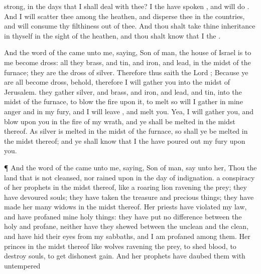 {strong, in the
days that I shall
deal with thee? I the
{} have
spoken
{}, and will
do
{}.
And I will
scatter thee among the
heathen, and
disperse thee in the
countries, and will
consume thy
filthiness out of thee.
And thou shalt take thine
inheritance in thyself in the
sight of the
heathen, and thou shalt
know that I
{} the
{}.
\par }{\PP {}And the
word of the
{} came unto me,
saying,
Son of
man, the
house of
Israel is to me become
dross: all they
{}
brass, and
tin, and
iron, and
lead, in the
midst of the
furnace; they are
{} the
dross of
silver.
Therefore thus
saith the
Lord
{}; Because ye are all become
dross, behold, therefore I will
gather you into the
midst of
Jerusalem.
 they
gather
silver, and
brass, and
iron, and
lead, and
tin, into the
midst of the
furnace, to
blow the
fire upon it, to
melt
{} so will I
gather
{} in mine
anger and in my
fury, and I will
leave
{}, and
melt you.
Yea, I will
gather you, and
blow upon you in the
fire of my
wrath, and ye shall be
melted in the
midst thereof.
As
silver is
melted in the
midst of the
furnace, so shall ye be
melted in the
midst thereof; and ye shall
know that I the
{} have poured
out my
fury upon you.
\par }{\PP {}¶ And the
word of the
{} came unto me,
saying,
Son of
man,
say unto her, Thou
{} the
land that is not
cleansed, nor
rained upon in the
day of
indignation.
 a
conspiracy of her
prophets in the
midst thereof, like a
roaring
lion
ravening the
prey; they have
devoured
souls; they have
taken the
treasure and precious
things; they have made her
many
widows in the
midst thereof.
Her
priests have
violated my
law, and have
profaned mine holy
things: they have put no
difference between the
holy and
profane, neither have they
shewed
{} between the
unclean and the
clean, and have
hid their
eyes from my
sabbaths, and I am
profaned
among them.
Her
princes in the
midst thereof
{} like
wolves
ravening the
prey, to
shed
blood,
{} to
destroy
souls, to
get dishonest
gain.
And her
prophets have
daubed them with
untempered
}
